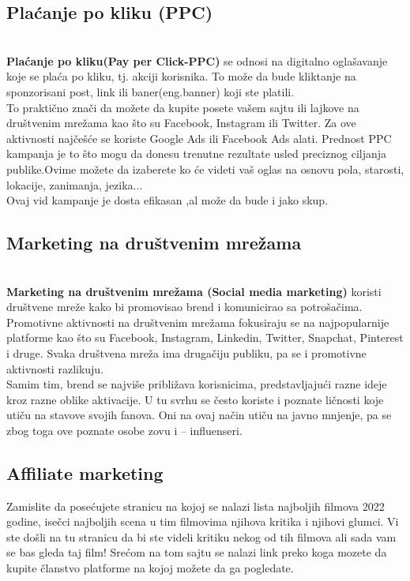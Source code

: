 \documentclass[a4paper]{article}
\begin{document}
{\subsection{Plaćanje po kliku (PPC)}
\label{subsec:PPC}
\\\textbf{Plaćanje po kliku(Pay per Click-PPC)} se odnosi na digitalno oglašavanje koje se plaća po kliku, tj. akciji korisnika. To može da bude kliktanje na sponzorisani post, link ili baner(eng.banner) koji ste platili.
\\To praktično znači da možete da kupite posete vašem sajtu ili lajkove na društvenim mrežama kao što su Facebook, Instagram ili Twitter. Za ove aktivnosti najčešće se koriste Google Ads ili Facebook Ads alati.
Prednost PPC kampanja je to što mogu da donesu trenutne rezultate usled preciznog ciljanja publike.Ovime možete da izaberete ko će videti vaš oglas na osnovu pola, starosti, lokacije, zanimanja, jezika...
\\Ovaj vid kampanje je dosta efikasan ,al može da bude i jako skup.
\subsection{Marketing na društvenim mrežama}
\label{subsec:Društvene mreže}
\\\textbf{Marketing na društvenim mrežama (Social media marketing)} koristi društvene mreže kako bi promovisao brend i komunicirao sa potrošačima. Promotivne aktivnosti na društvenim mrežama fokusiraju se na najpopularnije platforme kao što su Facebook, Instagram, Linkedin, Twitter, Snapchat, Pinterest i druge. Svaka društvena mreža ima drugačiju publiku, pa se i promotivne aktivnosti razlikuju.
\\Samim tim, brend se najviše približava korisnicima, predstavljajući razne ideje kroz razne oblike aktivacije. U tu svrhu se često koriste i poznate ličnosti koje utiču na stavove svojih fanova. Oni na ovaj način utiču na javno mnjenje, pa se zbog toga ove poznate osobe zovu i – influenseri.
\subsection{Affiliate marketing}
\label{subsec:affiliate marketing}
Zamislite da posećujete stranicu na kojoj se nalazi lista najboljih filmova 2022 godine, isečci najboljih scena u tim filmovima njihova kritika i njihovi glumci. Vi ste došli na tu stranicu da bi ste videli kritiku nekog od tih filmova ali sada vam se bas gleda taj film! Srećom  na tom sajtu se nalazi link preko koga mozete da kupite članstvo platforme na kojoj možete da ga pogledate. 

}
\end{document}
